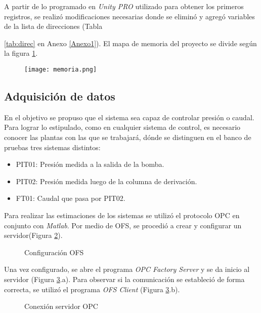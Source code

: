 
A partir de lo programado en \textit{Unity PRO} utilizado para obtener los primeros registros, se realizó modificaciones necesarias donde se eliminó y agregó variables de la lista de direcciones (Tabla {\ref{tab:direc} en Anexo \ref{Anexo1}). El mapa de memoria del proyecto se divide según la figura \ref{fig:memoria}.
	
\begin{figure}[h!]
	\centering
	\texttt{[image: memoria.png]}
	\label{fig:memoria}
\end{figure}


\subsection{Adquisición de datos}
En el objetivo se propuso que el sistema sea capaz de controlar presión o caudal. Para lograr lo estipulado, como en cualquier sistema de control, es necesario conocer las plantas con las que se trabajará, dónde se distinguen en el banco de pruebas tres sistemas distintos:
\begin{itemize}
	\item PIT01: Presión medida a la salida de la bomba.
	\item PIT02: Presión medida luego de la columna de derivación.
	\item FT01: Caudal que pasa por PIT02.
\end{itemize}

Para realizar las estimaciones de los sistemas se utilizó el protocolo OPC en conjunto con \textit{Matlab}. Por medio de OFS, se procedió a crear y configurar un servidor(Figura \ref{fig:opc1}).

\begin{figure}[htbp]
	\centering
	\caption{Configuración OFS} \label{fig:opc1}
\end{figure}


Una vez configurado, se abre el programa \textit{OPC Factory Server} y se da inicio al servidor (Figura \ref{fig:opc2}.a). Para observar si la comunicación se estableció de forma correcta, se utilizó el programa \textit{OFS Client} (Figura \ref{fig:opc2}.b).

\begin{figure}[htbp]
	\centering
	\caption{Conexión servidor OPC} \label{fig:opc2}
\end{figure}

}
